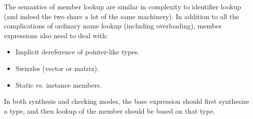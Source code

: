 \begin{Incomplete}
The semantics of member lookup are similar in complexity to identifier lookup (and indeed the two share a lot of the same machinery).
In addition to all the complications of ordinary name lookup (including overloading), member expressions also need to deal with:
\begin{itemize}
\item Implicit dereference of pointer-like types.
\item Swizzles (vector or matrix).
\item Static vs. instance members.
\end{itemize}

In both synthesis and checking modes, the base expression should first synthesize a type, and then lookup of the member should be based on that type.
\end{Incomplete}

